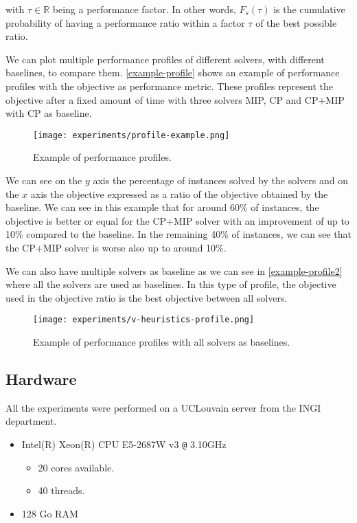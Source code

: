 \documentclass[../../thesis.tex]{subfiles}
\begin{document}
with $\tau \in \mathbb{R}$ being a performance factor. In other words, $F_s(\tau)$ is the cumulative probability
of having a performance ratio within a factor $\tau$ of the best possible ratio.


We can plot multiple performance profiles of different solvers, with different baselines, to compare them.
\autoref{example-profile} shows an example of performance profiles with the objective as performance metric.
These profiles represent the objective after a fixed amount of time 
with three solvers MIP, CP and CP+MIP with CP as baseline.

\begin{figure}
  \centering
  \texttt{[image: experiments/profile-example.png]}
  \caption{Example of performance profiles.}
  \label{example-profile}
\end{figure}

\FloatBarrier

We can see on the $y$ axis the percentage of instances solved by the solvers and on the $x$ axis the objective expressed
as a ratio of the objective obtained by the baseline. We can see in this example that for around 60\% of instances,
the objective is better or equal for the CP+MIP solver with an improvement of up to 10\% compared to the baseline.
In the remaining 40\% of instances, we can see that the CP+MIP solver is worse also up to around 10\%.



We can also have multiple solvers as baseline as we can see in \autoref{example-profile2} where all the solvers 
are used as baselines. In this type of profile, the objective used in the objective ratio is the best objective between all solvers.

\begin{figure}
  \centering
  \texttt{[image: experiments/v-heuristics-profile.png]}
  \caption{Example of performance profiles with all solvers as baselines.}
  \label{example-profile2}
\end{figure}

\FloatBarrier

\subsection{Hardware}

All the experiments were performed on a UCLouvain server \cite{jabba} from the INGI department.

\begin{itemize}
  \item Intel(R) Xeon(R) CPU E5-2687W v3 \verb+@+ 3.10GHz 
    \begin{itemize}
      \item 20 cores available.
      \item 40 threads.
    \end{itemize}
  \item 128 Go RAM
\end{itemize}
\end{document}
